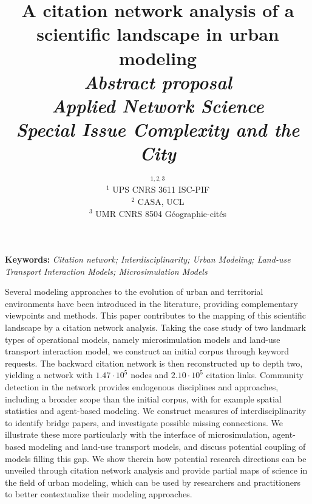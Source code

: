 




\title{A citation network analysis of a scientific landscape in urban modeling\\\medskip
\textit{Abstract proposal}\medskip\\
\textit{Applied Network Science}\\
\textit{Special Issue Complexity and the City}
}
\author{$^{1,2,3}$\medskip\\
$^1$ UPS CNRS 3611 ISC-PIF\\
$^2$ CASA, UCL\\
$^3$ UMR CNRS 8504 Géographie-cités
}
\date{}

\maketitle

\justify





\textbf{Keywords: }\textit{Citation network; Interdisciplinarity; Urban Modeling; Land-use Transport Interaction Models; Microsimulation Models}

\bigskip

Several modeling approaches to the evolution of urban and territorial environments have been introduced in the literature, providing complementary viewpoints and methods. This paper contributes to the mapping of this scientific landscape by a citation network analysis. Taking the case study of two landmark types of operational models, namely microsimulation models and land-use transport interaction model, we construct an initial corpus through keyword requests. The backward citation network is then reconstructed up to depth two, yielding a network with $1.47\cdot 10^5$ nodes and $2.10\cdot 10^5$ citation links. Community detection in the network provides endogenous disciplines and approaches, including a broader scope than the initial corpus, with for example spatial statistics and agent-based modeling. We construct measures of interdisciplinarity to identify bridge papers, and investigate possible missing connections. We illustrate these more particularly with the interface of microsimulation, agent-based modeling and land-use transport models, and discuss potential coupling of models filling this gap. We show therein how potential research directions can be unveiled through citation network analysis and provide partial maps of science in the field of urban modeling, which can be used by researchers and practitioners to better contextualize their modeling approaches.







%
%



